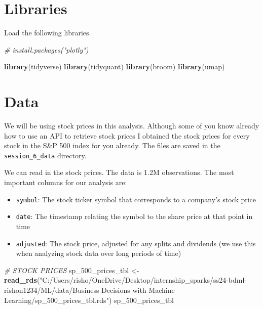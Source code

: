 \documentclass[
]{article}
\newenvironment{Shaded}{\begin{snugshade}}{\end{snugshade}}
\newcommand{\CommentTok}[1]{\textcolor[rgb]{0.56,0.35,0.01}{\textit{#1}}}
\newcommand{\FunctionTok}[1]{\textcolor[rgb]{0.13,0.29,0.53}{\textbf{#1}}}
\newcommand{\NormalTok}[1]{#1}
\newcommand{\OtherTok}[1]{\textcolor[rgb]{0.56,0.35,0.01}{#1}}
\newcommand{\StringTok}[1]{\textcolor[rgb]{0.31,0.60,0.02}{#1}}
\providecommand{\tightlist}{%
  \setlength{\itemsep}{0pt}\setlength{\parskip}{0pt}}
\begin{document}
\hypertarget{libraries}{%
\section{Libraries}\label{libraries}}

Load the following libraries.

\begin{Shaded}
\begin{Highlighting}[]
\CommentTok{\# install.packages("plotly")}

\FunctionTok{library}\NormalTok{(tidyverse)}
\FunctionTok{library}\NormalTok{(tidyquant)}
\FunctionTok{library}\NormalTok{(broom)}
\FunctionTok{library}\NormalTok{(umap)}
\end{Highlighting}
\end{Shaded}

\hypertarget{data}{%
\section{Data}\label{data}}

We will be using stock prices in this analysis. Although some of you
know already how to use an API to retrieve stock prices I obtained the
stock prices for every stock in the S\&P 500 index for you already. The
files are saved in the \texttt{session\_6\_data} directory.

We can read in the stock prices. The data is 1.2M observations. The most
important columns for our analysis are:

\begin{itemize}
\tightlist
\item
  \texttt{symbol}: The stock ticker symbol that corresponds to a
  company's stock price
\item
  \texttt{date}: The timestamp relating the symbol to the share price at
  that point in time
\item
  \texttt{adjusted}: The stock price, adjusted for any splits and
  dividends (we use this when analyzing stock data over long periods of
  time)
\end{itemize}

\begin{Shaded}
\begin{Highlighting}[]
\CommentTok{\# STOCK PRICES}
\NormalTok{sp\_500\_prices\_tbl }\OtherTok{\textless{}{-}} \FunctionTok{read\_rds}\NormalTok{(}\StringTok{"C:/Users/risho/OneDrive/Desktop/internship\_sparks/ss24{-}bdml{-}rishon1234/ML/data/Business Decisions with Machine Learning/sp\_500\_prices\_tbl.rds"}\NormalTok{)}
\NormalTok{sp\_500\_prices\_tbl}
\end{Highlighting}
\end{Shaded}
\end{document}
